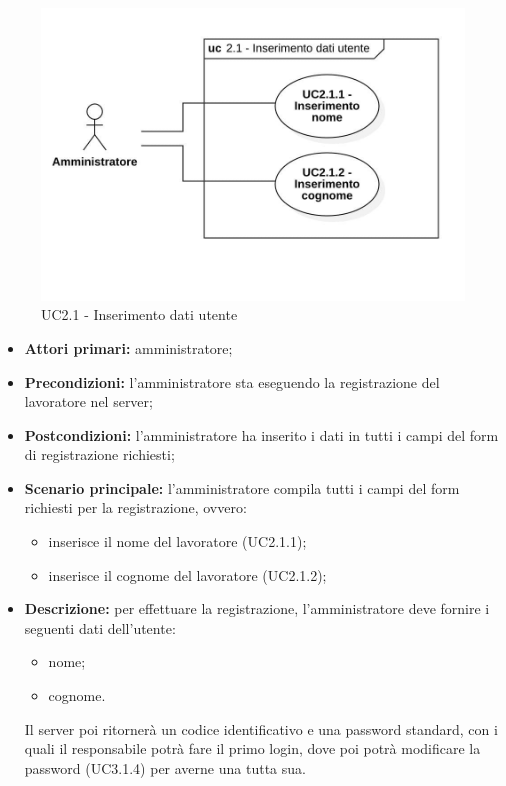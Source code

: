 \begin{figure}[H]
	\centering
	\includegraphics[scale=0.52]{res/images/uc2-1.png}
	\caption{UC2.1 - Inserimento dati utente}
\end{figure}

\begin{itemize}
	\item 	\textbf{Attori primari:} amministratore;
	\item 	\textbf{Precondizioni:}	l'amministratore sta eseguendo la registrazione del lavoratore nel server;
	\item 	\textbf{Postcondizioni:} l'amministratore ha inserito i dati in tutti i campi del form di registrazione richiesti;
	\item 	\textbf{Scenario principale:} l'amministratore compila tutti i campi del form richiesti per la registrazione, ovvero:
	\begin{itemize}
		\item inserisce il nome del lavoratore (UC2.1.1);
		\item inserisce il cognome del lavoratore (UC2.1.2);
	\end{itemize}
	\item 	\textbf{Descrizione:} per effettuare la registrazione, l'amministratore deve fornire i seguenti dati dell'utente:
	\begin{itemize}
		\item nome;
		\item cognome.
	\end{itemize}
Il server poi ritornerà un codice identificativo e una password standard, con i quali il responsabile potrà fare il primo login, dove poi potrà modificare la password (UC3.1.4) per averne una tutta sua.
\end{itemize}

